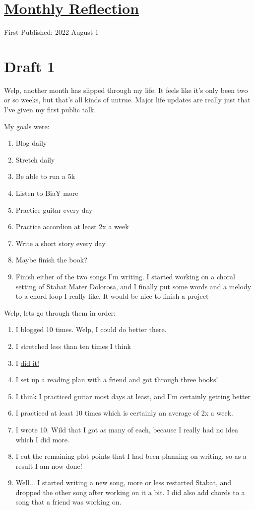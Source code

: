 \documentclass[12pt]{article}[titlepage]
\renewcommand{\,}{\textsuperscript{,}}
\begin{document}
\doublespacing
\section{\href{reflection-july-2022.html}{Monthly Reflection}}
First Published: 2022 August 1

\section{Draft 1}
Welp, another month has slipped through my life.
It feels like it's only been two or so weeks, but that's all kinds of untrue.
Major life updates are really just that I've given my first public talk.

My goals were:

\begin{enumerate}
\item Blog daily
\item Stretch daily
\item Be able to run a 5k
\item Listen to BiaY more
\item Practice guitar every day
\item Practice accordion at least 2x a week
\item Write a short story every day
\item Maybe finish the book?
\item Finish either of the two songs I'm writing. I started working on a choral setting of Stabat Mater Dolorosa, and I finally put some words and a melody to a chord loop I really like. It would be nice to finish a project
\end{enumerate}

Welp, lets go through them in order:

\begin{enumerate}
\item I blogged 10 times. Welp, I could do better there.
\item I stretched less than ten times I think
\item I \href{running.html}{did it!}
\item I set up a reading plan with a friend and got through three books!
\item I think I practiced guitar most days at least, and I'm certainly getting better
\item I practiced at least 10 times which is certainly an average of 2x a week.
\item I wrote 10. Wild that I got as many of each, because I really had no idea which I did more.
\item I cut the remaining plot points that I had been planning on writing, so as a result I am now done!
\item Well... I started writing a new song, more or less restarted Stabat, and dropped the other song after working on it a bit. I did also add chords to a song that a friend was working on.
\end{enumerate}
\end{document}
